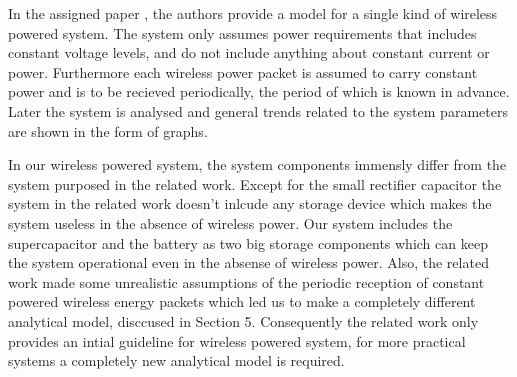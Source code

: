 In the assigned paper \cite{paper}, the authors provide a model for a single kind of wireless powered system. The system only assumes power requirements that includes constant voltage levels, and do not include anything about constant current or power. Furthermore each wireless power packet is assumed to carry constant power and is to be recieved periodically, the period of which is known in advance. Later the system is analysed and general trends related to the system parameters are shown in the form of graphs.

In our wireless powered system, the system components immensly differ from the system purposed in the related work. Except for the small rectifier capacitor the system in the related work doesn't inlcude any storage device which makes the system useless in the absence of wireless power. Our system includes the supercapacitor and the battery as two big storage components which can keep the system operational even in the absense of wireless power. Also, the related work made some unrealistic assumptions of the periodic reception of constant powered wireless energy packets which led us to make a completely different analytical model, disccused in Section 5. Consequently the related work only provides an intial guideline for wireless powered system, for more practical systems a completely new analytical model is required.      
 